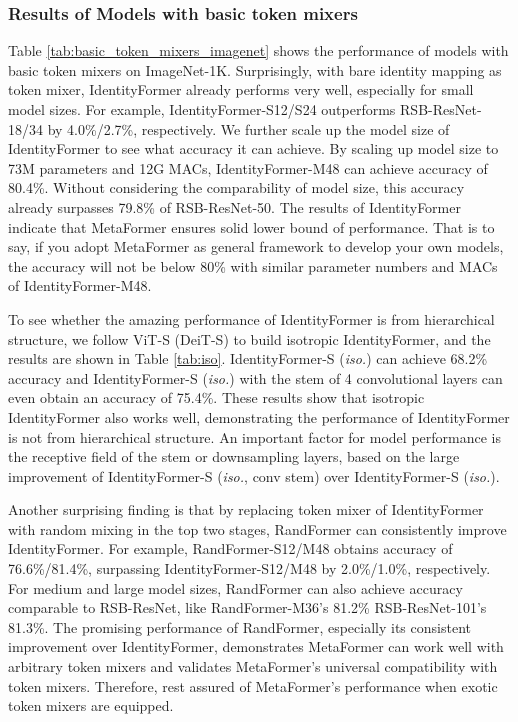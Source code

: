 \subsubsection{Results of Models with basic token mixers}
Table \ref{tab:basic_token_mixers_imagenet} shows the performance of models with basic token mixers on ImageNet-1K. Surprisingly, with bare identity mapping as token mixer, IdentityFormer already performs very well, especially for small model sizes. For example, IdentityFormer-S12/S24 outperforms RSB-ResNet-18/34 \cite{resnet, rsb} by 4.0\%/2.7\%, respectively. We further scale up the model size of IdentityFormer to see what accuracy it can achieve. By scaling up model size to 73M parameters and 12G MACs, IdentityFormer-M48 can achieve accuracy of 80.4\%. Without considering the comparability of model size, this accuracy already surpasses 79.8\% of RSB-ResNet-50. The results of IdentityFormer indicate that MetaFormer ensures solid lower bound of performance. That is to say, if you adopt MetaFormer as general framework to develop your own models, the accuracy will not be below 80\% with similar parameter numbers and MACs of IdentityFormer-M48. 


To see whether the amazing performance of IdentityFormer is from hierarchical structure, we follow ViT-S (DeiT-S) to build isotropic IdentityFormer, and the results are shown in Table \ref{tab:iso}. IdentityFormer-S (\textit{iso.}) can achieve 68.2\% accuracy and IdentityFormer-S (\textit{iso.}) with the stem of 4 convolutional layers can even obtain an accuracy of 75.4\%. These results show that isotropic IdentityFormer also works well, demonstrating the performance of IdentityFormer is not from hierarchical structure. An important factor for model performance is the receptive field of the stem or downsampling layers, based on the large improvement of IdentityFormer-S (\textit{iso.}, conv stem) over IdentityFormer-S (\textit{iso.}).


Another surprising finding is that by replacing token mixer of IdentityFormer with random mixing in the top two stages, RandFormer can consistently improve IdentityFormer. For example, RandFormer-S12/M48 obtains accuracy of 76.6\%/81.4\%, surpassing IdentityFormer-S12/M48 by 2.0\%/1.0\%, respectively. For medium and large model sizes, RandFormer can also achieve accuracy comparable to RSB-ResNet, like RandFormer-M36's 81.2\% \vs RSB-ResNet-101's 81.3\%. The promising performance of RandFormer, especially its consistent improvement over IdentityFormer, demonstrates MetaFormer can work well with arbitrary token mixers and validates MetaFormer's universal compatibility with token mixers. Therefore, rest assured of MetaFormer's performance when exotic token mixers are equipped.

